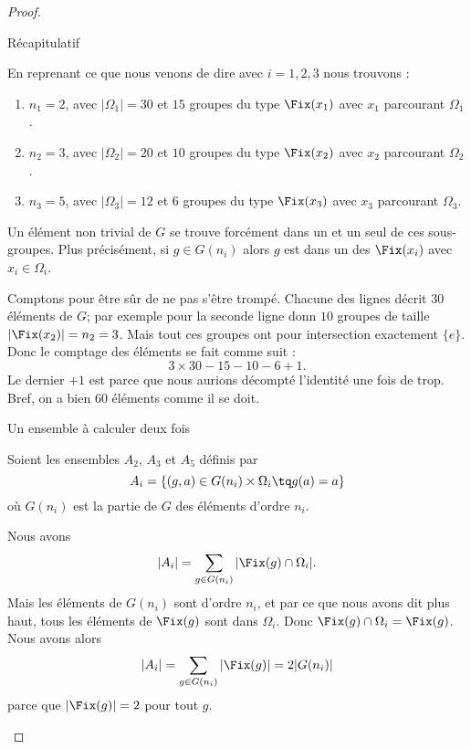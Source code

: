 \begin{proof}
\begin{subproof}
            \item[Récapitulatif]

                En reprenant ce que nous venons de dire avec \( i=1,2,3\) nous trouvons :
                \begin{enumerate}
                    \item
                        \( n_1=2\), avec \( | \Omega_1 |=30\) et \( 15\) groupes du type \( \Fix(x_1)\) avec \( x_1\) parcourant \( \Omega_1\).
                    \item
                        \( n_2=3\), avec \( | \Omega_2 |=20\) et \( 10\) groupes du type \( \Fix(x_2)\) avec \( x_2\) parcourant \( \Omega_2\).
                    \item
                        \( n_3=5\), avec \( | \Omega_3|=12\) et \( 6\) groupes du type \( \Fix(x_3)\) avec \( x_3\) parcourant \( \Omega_3\).
                \end{enumerate}
                Un élément non trivial de \( G\) se trouve forcément dans un et un seul de ces sous-groupes. Plus précisément, si \( g\in G(n_i)\) alors \( g\) est dans un des \( \Fix(x_i)\) avec \( x_i\in \Omega_i\).

                Comptons pour être sûr de ne pas s'être trompé. Chacune des lignes décrit \( 30\) éléments de \( G\); par exemple pour la seconde ligne donn \( 10\) groupes de taille \( | \Fix(x_2) |=n_2=3\). Mais tout ces groupes ont pour intersection exactement \( \{ e \}\). Donc le comptage des éléments se fait comme suit :
                \begin{equation}
                    3\times 30-15-10-6+1.
                \end{equation}
                Le dernier \( +1\) est parce que nous aurions décompté l'identité une fois de trop. Bref, on a bien \( 60\) éléments comme il se doit.

            \item[Un ensemble à calculer deux fois]

                Soient les ensembles \( A_2\), \( A_3\) et \( A_5\) définis par
                \begin{equation}
                    A_i=\{ (g,a)\in G(n_i)\times \Omega_i\tq g(a)=a  \}
                \end{equation}
                où \( G(n_i)\) est la partie de \( G\) des éléments d'ordre \( n_i\).

                Nous avons
                \begin{equation}
                    | A_i |=\sum_{g\in G(n_i)}| \Fix(g)\cap \Omega_i |.
                \end{equation}
                Mais les éléments de \( G(n_i)\) sont d'ordre \( n_i\), et par ce que nous avons dit plus haut, tous les éléments de \( \Fix(g)\) sont dans \( \Omega_i\). Donc \( \Fix(g)\cap \Omega_i=\Fix(g)\). Nous avons alors
                \begin{equation}
                    | A_i |=\sum_{g\in G(n_i)}| \Fix(g) |=2|G(n_i)|
                \end{equation}
                parce que \( | \Fix(g) |=2\) pour tout \( g\).


\end{subproof}
\end{proof}
